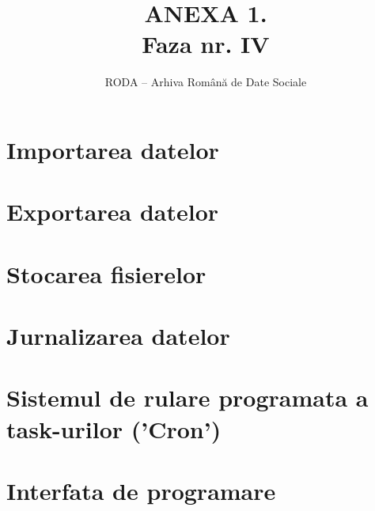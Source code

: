 \documentclass[11pt,twoside,romanian]{extbook}
\begin{document}
\fancyhead[RE,LO]{\thepage}


\title{ANEXA 1.\\
Faza nr. IV
}


\author{RODA -- Arhiva Rom\^{a}n\u{a} de Date Sociale}

\date{ }

\maketitle

\newpage
\thispagestyle{plain}
\tableofcontents{}
\setcounter{page}{1}


\chapter{Importarea datelor}


\chapter{Exportarea datelor}


\chapter{Stocarea fisierelor}


\chapter{Jurnalizarea datelor}


\chapter{Sistemul de rulare programata a task-urilor ('Cron')}



\chapter{Interfata de programare}

\end{document}
